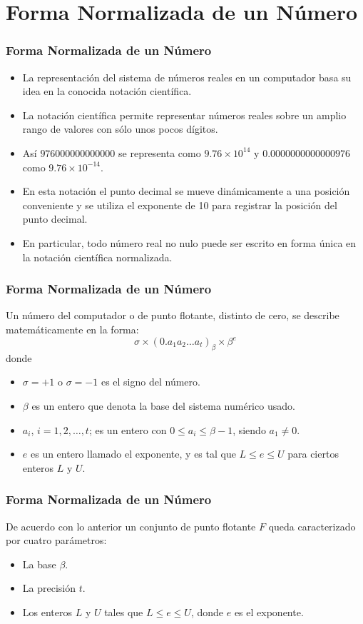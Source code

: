 \documentclass{beamer}
\begin{document}
\section{Forma Normalizada de un N\'umero}
\begin{frame}
  \frametitle{Forma Normalizada de un N\'umero}
  \begin{itemize}
    \item La representaci\'on del sistema de n\'umeros reales en un computador basa su idea en la conocida notaci\'on cient\'ifica. 
    \item<2-> La notaci\'on cient\'ifica permite representar n\'umeros reales sobre un amplio rango de valores con
    s\'olo unos pocos d\'igitos. 
    \item<3-> As\'i $976000000000000$ se representa como $9.76 \times 10^{14}$ y $0.0000000000000976$ como $9.76 \times 10^{-14}$. 
    \item<4-> En esta notaci\'on el punto decimal se mueve din\'amicamente a una posici\'on conveniente
    y se utiliza el exponente de 10 para registrar la posici\'on del punto decimal. 
    \item<5-> En particular, todo n\'umero real no  nulo puede ser escrito en forma \'unica en la notaci\'on cient\'ifica normalizada.
  \end{itemize}
\end{frame}
\frame
{
\frametitle{Forma Normalizada de un N\'umero}
Un n\'umero del computador o de punto flotante, distinto de cero, se describe matem\'aticamente en la forma:
$$
\sigma\times(0.a_1a_2\ldots a_t)_{\beta}\times\beta^e
$$
donde
\begin{itemize}
 \item<2->  $\sigma=+1$ o $\sigma=-1$ es el signo del n\'umero.
\item<3->  $\beta$ es un entero que denota la base del sistema num\'erico usado.
\item<4->  $a_i$, $i = 1,2,\ldots,t$; es un entero con $0\leq a_i \leq \beta-1$, siendo $a_1 \neq 0$.
\item<5->  $e$ es un entero llamado el exponente, y es tal que $L\leq e\leq U$ para ciertos enteros $L$ y $U$.
\end{itemize}
}
\frame
{
\frametitle{Forma Normalizada de un N\'umero}
De acuerdo con lo anterior un conjunto de punto flotante $F$ queda caracterizado por cuatro par\'ametros:
\begin{itemize}
 \item  La base $\beta$.
\item La precisi\'on $t$.
\item  Los enteros $L$ y $U$ tales que $L \leq e \leq U$, donde $e$ es el exponente.
\end{itemize}
}
\end{document}
